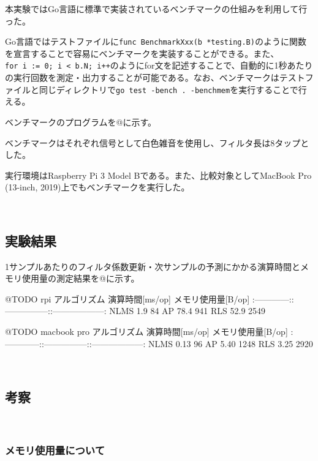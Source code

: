 本実験ではGo言語に標準で実装されているベンチマークの仕組みを利用して行った。

Go言語ではテストファイルに\texttt{func\ BenchmarkXxx(b\ *testing.B)}のように関数を宣言することで容易にベンチマークを実装することができる。また、\texttt{for\ i\ :=\ 0;\ i\ \textless{}\ b.N;\ i++}のようにfor文を記述することで、自動的に1秒あたりの実行回数を測定・出力することが可能である。なお、ベンチマークはテストファイルと同じディレクトリで\texttt{go\ test\ -bench\ .\ -benchmem}を実行することで行える。

ベンチマークのプログラムを@に示す。

ベンチマークはそれぞれ信号として白色雑音を使用し、フィルタ長は8タップとした。

実行環境はRaspberry Pi 3 Model Bである。また、比較対象としてMacBook Pro
(13-inch, 2019)上でもベンチマークを実行した。

\
\subsection{実験結果}\label{result-benchmark}

1サンプルあたりのフィルタ係数更新・次サンプルの予測にかかる演算時間とメモリ使用量の測定結果を@に示す。

@TODO rpi \textbar{} アルゴリズム \textbar{} 演算時間{[}ms/op{]}
\textbar{} メモリ使用量{[}B/op{]} \textbar{}
\textbar:------------:\textbar:---------------:\textbar:------------------:\textbar{}
\textbar{} NLMS \textbar{} 1.9 \textbar{} 84 \textbar{} \textbar{} AP
\textbar{} 78.4 \textbar{} 941 \textbar{} \textbar{} RLS \textbar{} 52.9
\textbar{} 2549 \textbar{}

@TODO macbook pro \textbar{} アルゴリズム \textbar{} 演算時間{[}ms/op{]}
\textbar{} メモリ使用量{[}B/op{]} \textbar{}
\textbar:------------:\textbar:---------------:\textbar:------------------:\textbar{}
\textbar{} NLMS \textbar{} 0.13 \textbar{} 96 \textbar{} \textbar{} AP
\textbar{} 5.40 \textbar{} 1248 \textbar{} \textbar{} RLS \textbar{}
3.25 \textbar{} 2920 \textbar{}

\
\subsection{考察}\label{consideration-color}

\
\subsubsection{メモリ使用量について}\label{about-memory}

